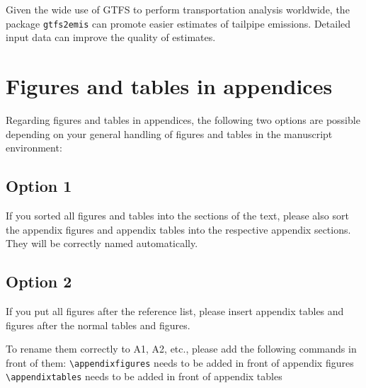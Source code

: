 \documentclass[gc, manuscript]{copernicus}
\begin{document}

Given the wide use of GTFS to perform transportation analysis worldwide,
the package \texttt{gtfs2emis} can promote easier estimates of tailpipe
emissions. Detailed input data can improve the quality of estimates.







\appendix
\section{Figures and tables in appendices}

Regarding figures and tables in appendices, the following two options
are possible depending on your general handling of figures and tables in
the manuscript environment:

\subsection{Option 1}

If you sorted all figures and tables into the sections of the text,
please also sort the appendix figures and appendix tables into the
respective appendix sections. They will be correctly named
automatically.

\subsection{Option 2}

If you put all figures after the reference list, please insert appendix
tables and figures after the normal tables and figures.

To rename them correctly to A1, A2, etc., please add the following
commands in front of them: \texttt{\textbackslash{}appendixfigures}
needs to be added in front of appendix figures
\texttt{\textbackslash{}appendixtables} needs to be added in front of
appendix tables
\end{document}
